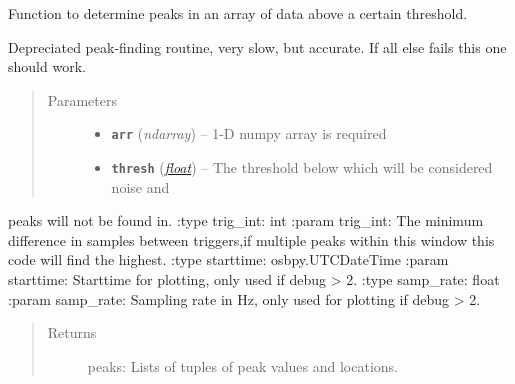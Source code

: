 \documentclass[a4paper,10pt,english]{sphinxmanual}
\begin{document}
\begin{fulllineitems}
\label{submodules/utils.findpeaks:findpeaks.find_peaks_dep}
Function to determine peaks in an array of data above a certain threshold.

Depreciated peak-finding routine, very slow, but accurate.  If all else fails this one should work.
\begin{quote}\begin{description}
\item[{Parameters}] \leavevmode\begin{itemize}
\item {} 
\textbf{\texttt{arr}} (\emph{ndarray}) -- 1-D numpy array is required

\item {} 
\textbf{\texttt{thresh}} (\href{https://docs.python.org/library/functions.html\#float}{\emph{float}}) -- The threshold below which will be considered noise and 

\end{itemize}

\end{description}\end{quote}

peaks will not be found in.
:type trig\_int: int
:param trig\_int: The minimum difference in samples between triggers,if multiple peaks within this window this code will find the highest.
:type starttime: osbpy.UTCDateTime
:param starttime: Starttime for plotting, only used if debug \textgreater{} 2.
:type samp\_rate: float
:param samp\_rate: Sampling rate in Hz, only used for plotting if debug \textgreater{} 2.
\begin{quote}\begin{description}
\item[{Returns}] \leavevmode
peaks: Lists of tuples of peak values and locations.

\end{description}\end{quote}

\end{fulllineitems}

\end{document}
